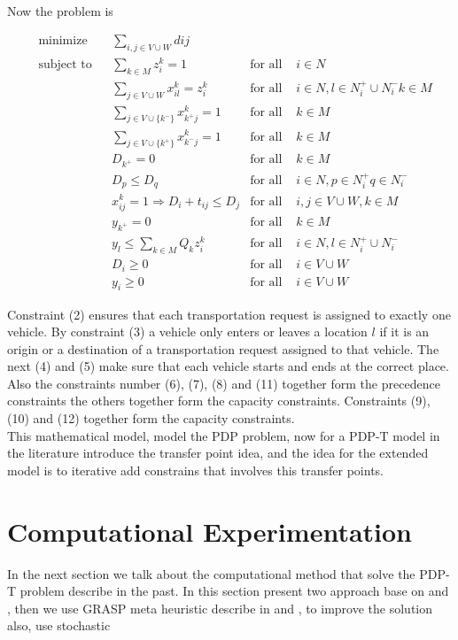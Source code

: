 \documentclass[10pt,twoside]{article}
\begin{document}
\citep{Parragh2008} \\

\vspace{1cm}
Now the problem is

\begin{align}
& {\text{minimize}}
& & \sum_{i,j\in V \cup W} dij && \\
& \text{subject to}
& & \sum_{k\in M} z_i^k = 1 & \text{for all }& i\in N \\
&&& \sum_{j\in V\cup W} x_{il}^k = z_{i}^k & \text{for all } &
    i \in N,l\in N^+_i\cup N_i^- k\in M\\
&&& \sum_{j\in V\cup\{k^-\}} x^k_{k^+ j} = 1 & \text{for all }& k\in M\\
&&& \sum_{j\in V\cup\{k^+\}} x^k_{k^- j} = 1 & \text{for all }& k\in M\\
&&& D_{k^+} = 0 & \text{for all }& k\in M\\
&&& D_p \leq D_q & \text{for all }& i\in N, p\in N_i^+ q\in N_i^-\\
&&& x_{ij}^k = 1\Rightarrow D_i + t_{ij} \leq D_j & \text{for all } &
    i,j \in V\cup W, k\in M\\
&&& y_{k^+} = 0 & \text{for all }& k\in M\\
&&& y_l \leq \sum_{k\in M} Q_kz_i^k & \text{for all } &
    i\in N, l\in N_i^+\cup N_i^-\\
&&& D_i \geq 0 & \text{for all }& i\in V\cup W\\
&&& y_i \geq 0 & \text{for all }& i\in V\cup W
\end{align}

Constraint (2) ensures that each transportation request is assigned to exactly
one vehicle. By constraint (3) a vehicle only enters or leaves a location $l$
if it is an origin or a destination of a transportation request assigned to that
vehicle. The next (4) and (5) make sure that each vehicle starts and ends at
the correct place. Also the constraints number (6), (7), (8) and (11) together
form the precedence constraints the others together form the capacity
constraints.  Constraints (9), (10) and (12) together form the capacity
constraints.\\
This mathematical model, model the PDP problem, now for a PDP-T model in the
literature introduce the transfer point idea, and the idea for the extended
model is to iterative add constrains that involves this transfer points.

\section{Computational Experimentation}\label{sec_results}
In the next section we talk about the computational method that solve the PDP-T
problem describe in the past. In this section present two approach base on
\cite{multistart} and \cite{CITAR}, then we use GRASP meta heuristic describe in
\cite{GRASP} and \cite{bGRASP}, to improve the solution also, use stochastic
\end{document}

